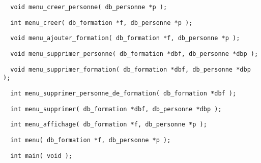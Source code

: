 \documentclass[11pt]{article}
\begin{document}
\begin{lstlisting}
  void menu_creer_personne( db_personne *p );
\end{lstlisting}

\begin{lstlisting}
  int menu_creer( db_formation *f, db_personne *p );
\end{lstlisting}

\begin{lstlisting}
  void menu_ajouter_formation( db_formation *f, db_personne *p );
\end{lstlisting}

\begin{lstlisting}
  void menu_supprimer_personne( db_formation *dbf, db_personne *dbp );
\end{lstlisting}

\begin{lstlisting}
  void menu_supprimer_formation( db_formation *dbf, db_personne *dbp );
\end{lstlisting}

\begin{lstlisting}
  int menu_supprimer_personne_de_formation( db_formation *dbf );
\end{lstlisting}

\begin{lstlisting}
  int menu_supprimer( db_formation *dbf, db_personne *dbp );
\end{lstlisting}

\begin{lstlisting}
  int menu_affichage( db_formation *f, db_personne *p );
\end{lstlisting}

\begin{lstlisting}
  int menu( db_formation *f, db_personne *p );
\end{lstlisting}

\begin{lstlisting}
  int main( void );
\end{lstlisting}

\newpage
\printglossary
\end{document}
